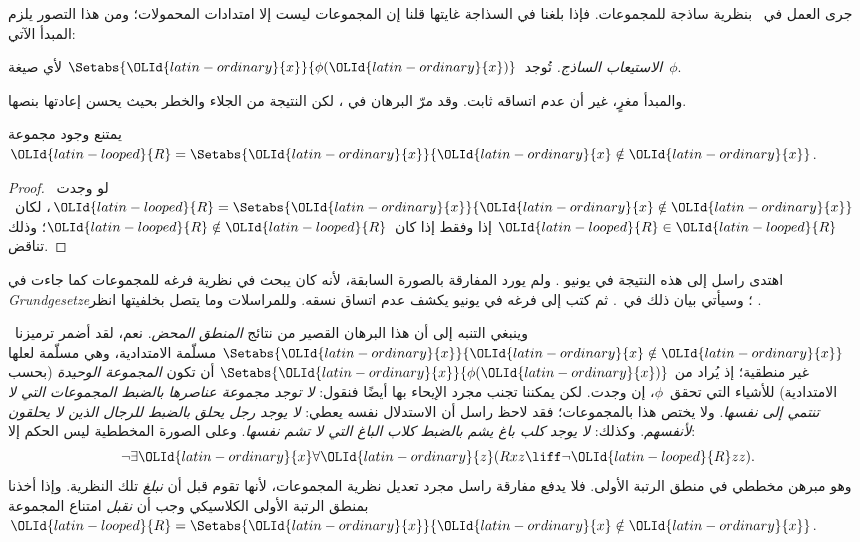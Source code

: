 \documentclass[../../../include/open-logic-section]{subfiles}
\begin{document}

جرى العمل في~ بنظرية ساذجة للمجموعات. فإذا بلغنا
في السذاجة غايتها قلنا إن المجموعات ليست إلا امتدادات المحمولات؛ ومن
هذا التصور يلزم المبدأ الآتي:

\begin{defish}
  \emph{الاستيعاب الساذج.} تُوجد~$\Setabs{{\OLId{latin-ordinary}{x}}}{\phi({\OLId{latin-ordinary}{x}})}$ لأي صيغة~$\phi$.
\end{defish}

والمبدأ مغرٍ، غير أن عدم اتساقه ثابت. وقد مرّ البرهان في
، لكن النتيجة من الجلاء والخطر بحيث يحسن
إعادتها بنصها.

\begin{thm}
يمتنع وجود مجموعة~${\OLId{latin-looped}{R}} = \Setabs{{\OLId{latin-ordinary}{x}}}{{\OLId{latin-ordinary}{x}} \notin {\OLId{latin-ordinary}{x}}}$.
\end{thm}

\begin{proof}
لو وجدت~${\OLId{latin-looped}{R}} = \Setabs{{\OLId{latin-ordinary}{x}}}{{\OLId{latin-ordinary}{x}} \notin {\OLId{latin-ordinary}{x}}}$، لكان~${\OLId{latin-looped}{R}} \in {\OLId{latin-looped}{R}}$ إذا وفقط إذا
كان~${\OLId{latin-looped}{R}} \notin {\OLId{latin-looped}{R}}$؛ وذلك تناقض.
\end{proof}

اهتدى راسل إلى هذه النتيجة في يونيو . ولم يورد المفارقة بالصورة
السابقة، لأنه كان يبحث في نظرية فرغه للمجموعات كما جاءت في
\emph{Grundgesetze}؛ وسيأتي بيان ذلك في~. ثم كتب إلى
فرغه في  يونيو  يكشف عدم اتساق نسقه. وللمراسلات وما يتصل بخلفيتها
انظر
\citet[pp.~124--8]{Heijenoort1967}.

وينبغي التنبه إلى أن هذا البرهان القصير من نتائج \emph{المنطق المحض}.
نعم، لقد أضمر ترميزنا~$\Setabs{{\OLId{latin-ordinary}{x}}}{{\OLId{latin-ordinary}{x}} \notin {\OLId{latin-ordinary}{x}}}$ مسلّمة الامتدادية،
وهي مسلّمة لعلها غير منطقية؛ إذ يُراد من
$\Setabs{{\OLId{latin-ordinary}{x}}}{\phi({\OLId{latin-ordinary}{x}})}$ أن تكون \emph{المجموعة الوحيدة} (بحسب
الامتدادية) للأشياء التي تحقق~$\phi$، إن وجدت. لكن يمكننا تجنب مجرد
الإيحاء بها أيضًا فنقول: \emph{لا توجد مجموعة عناصرها بالضبط المجموعات
التي لا تنتمي إلى نفسها}. ولا يختص هذا بالمجموعات؛ فقد لاحظ راسل أن
الاستدلال نفسه يعطي: \emph{لا يوجد رجل يحلق بالضبط للرجال الذين لا
يحلقون لأنفسهم}. وكذلك: \emph{لا يوجد كلب باغ يشم بالضبط كلاب الباغ
التي لا تشم نفسها}. وعلى الصورة المخططية ليس الحكم إلا:
\[
\lnot \exists {\OLId{latin-ordinary}{x}} \forall {\OLId{latin-ordinary}{z}}(Rxz \liff \lnot {\OLId{latin-looped}{R}} zz).
\]
وهو مبرهن مخططي في منطق الرتبة الأولى. فلا يدفع مفارقة راسل مجرد تعديل
نظرية المجموعات، لأنها تقوم قبل أن \emph{نبلغ} تلك النظرية. وإذا أخذنا
بمنطق الرتبة الأولى الكلاسيكي وجب أن \emph{نقبل} امتناع المجموعة
${\OLId{latin-looped}{R}} = \Setabs{{\OLId{latin-ordinary}{x}}}{{\OLId{latin-ordinary}{x}}\notin {\OLId{latin-ordinary}{x}}}$.
\end{document}
